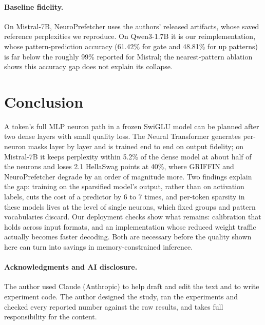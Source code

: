 \documentclass[10pt,twocolumn,letterpaper]{article}
\begin{document}
\paragraph{Baseline fidelity.} On Mistral-7B, NeuroPrefetcher uses the authors' released artifacts, whose saved reference perplexities we reproduce. On Qwen3-1.7B it is our reimplementation, whose pattern-prediction accuracy (61.42\% for gate and 48.81\% for up patterns) is far below the roughly 99\% reported for Mistral; the nearest-pattern ablation shows this accuracy gap does not explain its collapse.

\section{Conclusion}

A token's full MLP neuron path in a frozen SwiGLU model can be planned after two dense layers with small quality loss. The Neural Transformer generates per-neuron masks layer by layer and is trained end to end on output fidelity; on Mistral-7B it keeps perplexity within 5.2\% of the dense model at about half of the neurons and loses 2.1 HellaSwag points at 40\%, where GRIFFIN and NeuroPrefetcher degrade by an order of magnitude more. Two findings explain the gap: training on the sparsified model's output, rather than on activation labels, cuts the cost of a predictor by 6 to 7 times, and per-token sparsity in these models lives at the level of single neurons, which fixed groups and pattern vocabularies discard. Our deployment checks show what remains: calibration that holds across input formats, and an implementation whose reduced weight traffic actually becomes faster decoding. Both are necessary before the quality shown here can turn into savings in memory-constrained inference.

\paragraph{Acknowledgments and AI disclosure.} The author used Claude (Anthropic) to help draft and edit the text and to write experiment code. The author designed the study, ran the experiments and checked every reported number against the raw results, and takes full responsibility for the content.
\end{document}
